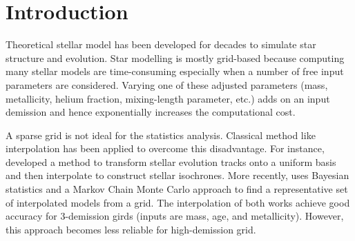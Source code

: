 \section{Introduction}

Theoretical stellar model has been developed for decades to simulate star structure and evolution. Star modelling is mostly grid-based \citep[e.g.][]{2016ApJ...823..102C} because computing many stellar models are time-consuming especially when a number of free input parameters are considered. Varying one of these adjusted parameters (mass, metallicity, helium fraction, mixing-length parameter, etc.) adds on an input demission and hence exponentially increases the computational cost. 

A sparse grid is not ideal for the statistics analysis. Classical method like interpolation has been applied to overcome this disadvantage. For instance, \citet{2016ApJS..222....8D} developed a method to transform stellar evolution tracks onto a uniform basis and then interpolate to construct stellar isochrones. More recently, \citet{2019MNRAS.484..771R} uses Bayesian statistics and a Markov Chain Monte Carlo approach to find a representative set of interpolated models from a grid. The interpolation of both works achieve good accuracy for 3-demission girds (inputs are mass, age, and metallicity). However, this approach becomes less reliable for high-demission grid. 

